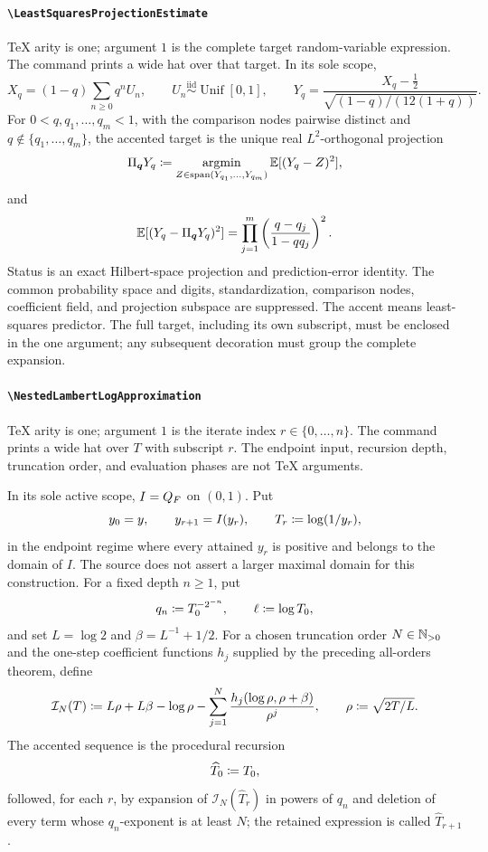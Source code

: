 \documentclass[11pt,oneside]{article}
\theoremstyle{definition}
\theoremstyle{remark}
\DeclareRobustCommand{\commandname}[1]{\texttt{\textbackslash#1}}
\DeclareRobustCommand{\localaccentname}[1]{\commandname{#1}}
\begin{document}
\paragraph{\localaccentname{LeastSquaresProjectionEstimate}}
TeX arity is one; argument \(1\) is the complete target random-variable
expression.  The command prints a wide hat over that target.  In its sole
scope,
\[
 X_q=(1-q)\sum_{n\ge0}q^nU_n,\qquad
 U_n\stackrel{\mathrm{iid}}{\sim}\operatorname{Unif}[0,1],
 \qquad
 Y_q=
 \frac{X_q-\tfrac12}
 {\sqrt{(1-q)/(12(1+q))}}.
\]
For \(0<q,q_1,\ldots,q_m<1\), with the comparison nodes pairwise distinct and
\(q\notin\{q_1,\ldots,q_m\}\), the accented target is
the unique real \(L^2\)-orthogonal projection
\[
 \Pi_{\boldsymbol q}Y_q
 \mathrel{\coloneqq}
 \operatorname*{argmin}_{
 Z\in\operatorname{span}(Y_{q_1},\ldots,Y_{q_m})}
 \mathbb{E}[(Y_q-Z)^2],
\]
and
\[
 \mathbb{E}[(Y_q-\Pi_{\boldsymbol q}Y_q)^2]
 =
 \prod_{j=1}^{m}
 \left(\frac{q-q_j}{1-qq_j}\right)^2.
\]
Status is an exact Hilbert-space projection and prediction-error identity.
The common probability space and digits, standardization, comparison nodes,
coefficient field, and projection subspace are suppressed.  The accent means
least-squares predictor.  The full target, including its own subscript, must
be enclosed in the one argument; any subsequent decoration must group the
complete expansion.

\paragraph{\localaccentname{NestedLambertLogApproximation}}
TeX arity is one; argument \(1\) is the iterate index
\(r\in\{0,\ldots,n\}\).  The command prints a wide hat over \(T\) with
subscript \(r\).  The endpoint input, recursion depth, truncation order, and
evaluation phases are not TeX arguments.

In its sole active scope, \(I=Q_{F}\) on \((0,1)\).  Put
\[
 y_0=y,\qquad y_{r+1}=I(y_r),\qquad
 T_r\mathrel{\coloneqq}\log(1/y_r),
\]
in the endpoint regime where every attained \(y_r\) is positive and belongs
to the domain of \(I\).  The source does not assert a larger maximal domain
for this construction.  For a fixed depth \(n\ge1\), put
\[
 q_n\mathrel{\coloneqq} T_0^{-2^{-n}},\qquad
 \ell\mathrel{\coloneqq}\log T_0,
\]
and set \(L=\log2\) and \(\beta=L^{-1}+1/2\).  For a chosen truncation order
\(N\in\mathbb{N}_{>0}\) and the one-step coefficient functions \(h_j\)
supplied by the preceding all-orders theorem, define
\[
 \mathcal I_N(T)
 \mathrel{\coloneqq}
 L\rho+L\beta-\log\rho
 -\sum_{j=1}^{N}
   \frac{h_j(\log\rho,\rho+\beta)}{\rho^j},
 \qquad
 \rho\mathrel{\coloneqq}\sqrt{2T/L}.
\]
The accented sequence is the procedural recursion
\[
 \widehat T_0\mathrel{\coloneqq} T_0,
\]
followed, for each \(r\), by expansion of
\(\mathcal I_N(\widehat T_r)\) in powers of \(q_n\) and deletion of every
term whose \(q_n\)-exponent is at least \(N\); the retained expression is
called \(\widehat T_{r+1}\).
\end{document}
